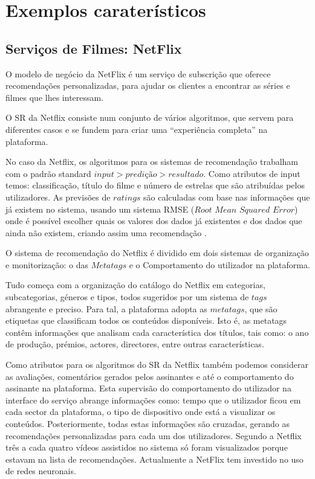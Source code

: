 \section{Exemplos caraterísticos}
\subsection{ Serviços de Filmes: NetFlix}
\hfill
\par O modelo de negócio da NetFlix é um serviço de subscrição que oferece recomendações personalizadas, para ajudar os clientes a encontrar as séries e filmes que lhes interessam.
\par O SR da Netflix consiste num conjunto de vários algoritmos, que servem para diferentes casos e se fundem para criar uma “experiência completa” na plataforma.
\par No caso da Netflix, os algoritmos para os sistemas de recomendação trabalham com o padrão standard $input> predição> resultado$. Como atributos de input temos: classificação, título do filme e número de estrelas que são atribuídas pelos utilizadores. As previsões de $ratings$ são calculadas com base nas informações que já existem no sistema, usando um sistema RMSE ($Root$ $Mean$ $Squared$ $Error$) onde é possível escolher quais os valores dos dados já existentes e dos dados que ainda não existem, criando assim uma recomendação \cite{ref_url1}.
\par O sistema de recomendação do Netflix é dividido em dois sistemas de organização e monitorização: o das $Metatags$ e o Comportamento do utilizador na plataforma. 
\par Tudo começa com a organização do catálogo do Netflix em categorias, subcategorias, géneros e tipos, todos sugeridos por um sistema de $tags$ abrangente e preciso. Para tal, a plataforma adopta as $metatags$, que são etiquetas que classificam todos os conteúdos disponíveis. Isto é, as metatags contêm informações que analisam cada característica dos títulos, tais como: o ano de produção, prémios, actores, directores, entre outras características. 
\par Como atributos para os algoritmos do SR da Netflix também podemos considerar as avaliações, comentários gerados pelos assinantes e até o comportamento do assinante na plataforma. Esta supervisão do comportamento do utilizador na interface do serviço abrange informações como: tempo que o utilizador ficou em cada sector da plataforma, o tipo de dispositivo onde está a visualizar os conteúdos. Posteriormente, todas estas informações são cruzadas, gerando as recomendações personalizadas para cada um dos utilizadores. Segundo a Netflix três a cada quatro vídeos assistidos no sistema só foram visualizados porque estavam na lista de recomendações. Actualmente a NetFlix tem investido no uso de redes neuronais.





